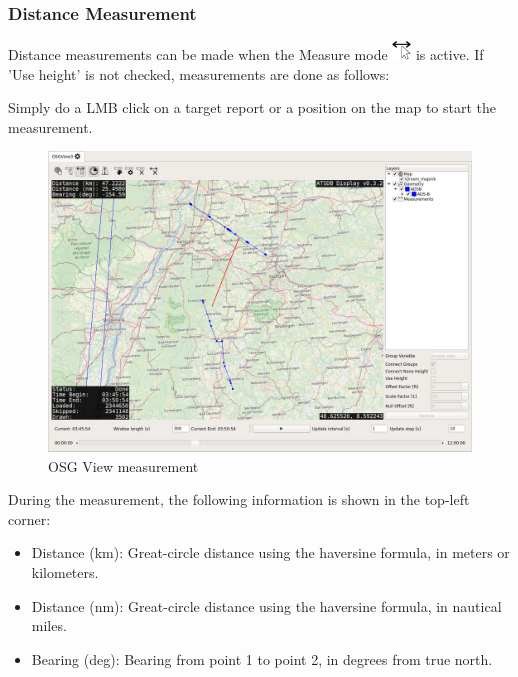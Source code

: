 \subsubsection{Distance Measurement}

Distance measurements can be made when the Measure mode \includegraphics[width=0.5cm,frame]{../../data/icons/measure_action.png} is active. If 'Use height' is not checked, measurements are done as follows:

Simply do a LMB click on a target report or a position on the map to start the measurement.

\begin{figure}[H]
    \hspace*{-2cm}
    \includegraphics[width=18cm,frame]{../screenshots/osgview_measure1.png}
  \caption{OSG View measurement}
\end{figure}

During the measurement, the following information is shown in the top-left corner:

\begin{itemize}
 \item Distance (km): Great-circle distance using the haversine formula, in meters or kilometers.
 \item Distance (nm): Great-circle distance using the haversine formula, in nautical miles.
 \item  Bearing (deg): Bearing from point 1 to point 2, in degrees from true north.
\end{itemize}

